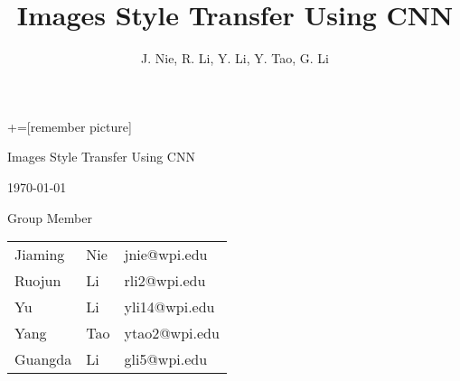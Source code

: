 \documentclass{beamer} %
\author{J. Nie, R. Li, Y. Li, Y. Tao, G. Li}
\title{Images Style Transfer Using CNN}
\begin{document}
\begin{comment}
:Title: Beamer arrows
:Tags: Remember picture, Beamer, Physics & chemistry, Overlays
:Use page: 3

With PGF/TikZ version 1.09 and later, it is possible to draw paths between nodes across
different pictures. This is a useful feature for presentations with the
Beamer package. In this example I've combined the new PGF/TikZ's overlay feature
with Beamer overlays. Download the PDF version to see the result.

**Note.** This only works with PDFTeX, and you have to run PDFTeX twice.

| Author: Kjell Magne Fauske

\end{comment}


+=[remember picture]

\everymath{\displaystyle}

\begin{frame}
\vspace{-3em}
\begin{center}
\LARGE{Images Style Transfer Using CNN}
\end{center}

\vspace{0.5em}
\begin{center}
\today
\end{center}

\begin{center}
	
Group Member
\end{center}

\begin{center}
\small
		\begin{tabular}{l l l} 
			Jiaming & Nie  &   jnie@wpi.edu \\
			Ruojun & Li  &   rli2@wpi.edu \\
			Yu & Li  &  yli14@wpi.edu \\
			Yang & Tao   &  ytao2@wpi.edu \\
			Guangda & Li &    gli5@wpi.edu    \\
		\end{tabular}
\end{center}
\end{frame}
\end{document}
